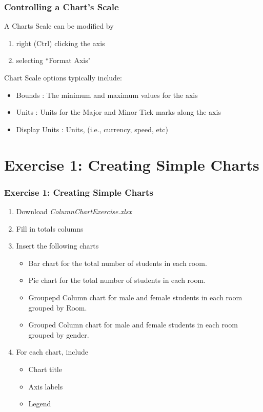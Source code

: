 \documentclass[12pt]{beamer}
\begin{document}
	\begin{frame}
		\frametitle{Controlling a Chart's Scale}
		A Charts Scale can be modified by 
		\begin{enumerate} 
			\item right (Ctrl)  clicking the axis
			\item selecting ``Format Axis"
		\end{enumerate}
	Chart Scale options typically include:
	\begin{itemize}
		\item Bounds : The minimum and maximum values for the axis
		\item Units : Units for the Major and Minor Tick marks along the axis
		\item Display Units : Units, (i.e., currency, speed, etc)
	\end{itemize}
	
\end{frame}
\section{Exercise 1: Creating Simple Charts}
	\begin{frame}
		\frametitle{Exercise 1: Creating Simple Charts}
		\begin{enumerate}
			\item Download \textit{ColumnChartExercise.xlsx}
			\item Fill in totals columns 
			\item Insert the following charts
			\begin{itemize}
				\item Bar chart for the total number of students in each room.
				\item Pie chart for the total number of students in each room.
				\item Groupepd Column chart for male and female students in each room grouped by Room.
				\item Grouped Column chart for male and female students in each room grouped by gender. 
				\end{itemize}
			\item For each chart, include
			\begin{itemize}
				\item Chart title
				\item Axis labels
				\item Legend
			\end{itemize}
	\end{enumerate}
\end{frame}
\end{document}
